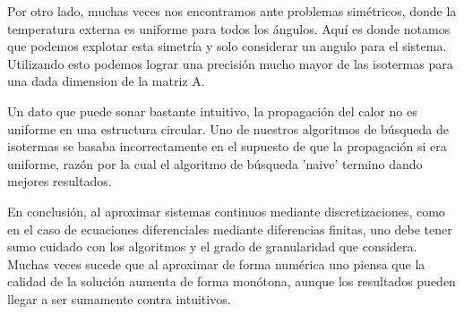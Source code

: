 Por otro lado, muchas veces nos encontramos ante problemas simétricos, donde la temperatura externa es uniforme para todos los ángulos. Aquí es donde notamos que podemos explotar esta simetría y solo considerar un angulo para el sistema. Utilizando esto podemos lograr una precisión mucho mayor de las isotermas para una dada dimension de la matriz A.

Un dato que puede sonar bastante intuitivo, la propagación del calor no es uniforme en una estructura circular. Uno de nuestros algoritmos de búsqueda de isotermas se basaba incorrectamente en el supuesto de que la propagación si era uniforme, razón por la cual el algoritmo de búsqueda 'naive' termino dando mejores resultados.

En conclusión, al aproximar sistemas continuos mediante discretizaciones, como en el caso de ecuaciones diferenciales mediante diferencias finitas, uno debe tener sumo cuidado con los algoritmos y el grado de granularidad que considera. Muchas veces sucede que al aproximar de forma numérica uno piensa que la calidad de la solución aumenta de forma monótona, aunque los resultados pueden llegar a ser sumamente contra intuitivos.